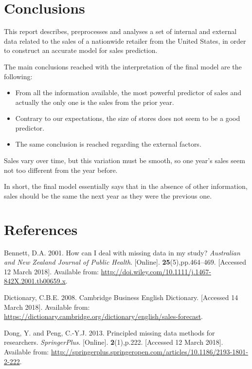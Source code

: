 \documentclass[11pt,]{article}
\providecommand{\tightlist}{%
  \setlength{\itemsep}{0pt}\setlength{\parskip}{0pt}}
\begin{document}
\pagebreak

\section{Conclusions}\label{conclusions}

This report describes, preprocesses and analyses a set of internal and
external data related to the sales of a nationwide retailer from the
United States, in order to construct an accurate model for sales
prediction.

The main conclusions reached with the interpretation of the final model
are the following:

\begin{itemize}
\tightlist
\item
  From all the information available, the most powerful predictor of
  sales and actually the only one is the sales from the prior year.
\item
  Contrary to our expectations, the size of stores does not seem to be a
  good predictor.
\item
  The same conclusion is reached regarding the external factors.
\end{itemize}

Sales vary over time, but this variation must be smooth, so one year's
sales seem not too different from the year before.

In short, the final model essentially says that in the absence of other
information, sales should be the same the next year as they were the
previous one.

\section*{References}\label{references}

\hypertarget{refs}{}
\hypertarget{ref-bennett_how_2001}{}
Bennett, D.A. 2001. How can I deal with missing data in my study?
\emph{Australian and New Zealand Journal of Public Health}.
{[}Online{]}. \textbf{25}(5),pp.464--469. {[}Accessed 12 March 2018{]}.
Available from:
\url{http://doi.wiley.com/10.1111/j.1467-842X.2001.tb00659.x}.

\hypertarget{ref-cambridge_business_english_dictionary_cambridge_2008}{}
Dictionary, C.B.E. 2008. Cambridge Business English Dictionary.
{[}Accessed 14 March 2018{]}. Available from:
\url{https://dictionary.cambridge.org/dictionary/english/sales-forecast}.

\hypertarget{ref-dong_principled_2013}{}
Dong, Y. and Peng, C.-Y.J. 2013. Principled missing data methods for
researchers. \emph{SpringerPlus}. {[}Online{]}. \textbf{2}(1),p.222.
{[}Accessed 12 March 2018{]}. Available from:
\url{http://springerplus.springeropen.com/articles/10.1186/2193-1801-2-222}.
\end{document}
